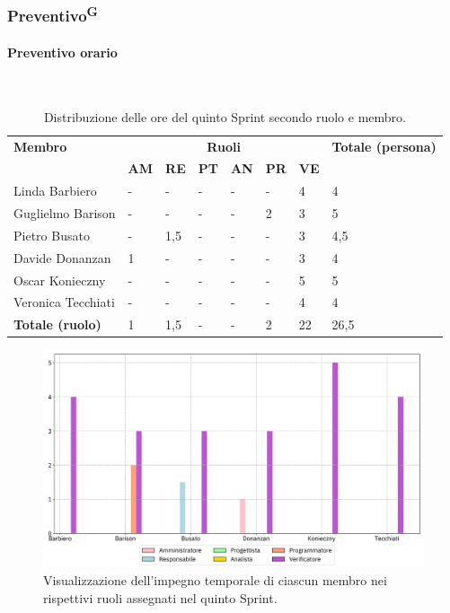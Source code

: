 \documentclass[8pt]{article}
\newcommand{\glossterm}[1]{#1\textsuperscript{G}} %
\newcommand{\subsubsubsection}[1]{\paragraph{#1}\mbox{}\\}
\begin{document}
\subsubsection{\glossterm{Preventivo}}
\subsubsubsection{Preventivo orario}
\begin{table}[ht!]
	\centering
	\begin{tabular}{p{4cm} p{1cm} p{1cm} p{1cm} p{1cm} p{1cm} p{1cm} p{3cm}}
		\toprule
        \textbf{Membro} & \multicolumn{6}{c}{\textbf{Ruoli}} & \textbf{Totale (persona)}\\
		& \textbf{AM} & \textbf{RE} & \textbf{PT} & \textbf{AN} & \textbf{PR} & \textbf{VE}\\
		\midrule
        Linda Barbiero          & -     & -     & -     & -     & -     & 4     & 4 \\
        Guglielmo Barison       & -     & -     & -     & -     & 2     & 3     & 5\\
        Pietro Busato           & -     & 1,5   & -     & -     & -     & 3     & 4,5 \\
        Davide Donanzan         & 1     & -     & -     & -     & -     & 3     & 4 \\
        Oscar Konieczny         & -     & -     & -     & -     & -     & 5     & 5 \\
        Veronica Tecchiati      & -     & -     & -     & -     & -     & 4     & 4 \\
        \midrule
        \textbf{Totale (ruolo)} & 1     & 1,5   & -    & -      & 2  & 22   & 26,5 \\
	\bottomrule
	\end{tabular}
	\caption{Distribuzione delle ore del quinto Sprint secondo ruolo e membro.}
	\label{table:Distribuzione delle ore del quinto Sprint secondo ruolo e membro}
\end{table}
\begin{figure}[ht!]
    \centering
    \includegraphics[width=15cm]{./images_pdp/istogramma_periodo_5.png}
    \caption{Visualizzazione dell'impegno temporale di ciascun membro nei rispettivi ruoli assegnati
    nel quinto Sprint.}
    \label{figure:Visualizzazione dell'impegno temporale di ciascun membro nei rispettivi ruoli
    assegnati nel quinto Sprint}
\end{figure}
\end{document}
